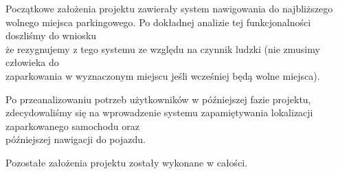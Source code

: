 \documentclass[12pt,a4paper]{article}
\begin{document}
Początkowe założenia projektu zawierały system nawigowania do najbliższego wolnego miejsca parkingowego. Po dokładnej analizie tej funkcjonalności doszliśmy do wniosku\\że rezygnujemy z tego systemu ze względu na czynnik ludzki (nie zmusimy człowieka do\\zaparkowania w wyznaczonym miejscu jeśli wcześniej będą wolne miejsca).
\newline

Po przeanalizowaniu potrzeb użytkowników w późniejszej fazie projektu,  zdecydowaliśmy się na wprowadzenie systemu zapamiętywania lokalizacji zaparkowanego samochodu oraz\\późniejszej nawigacji do pojazdu.
\newline

 Pozostałe założenia projektu zostały wykonane w całości.
\end{document}
